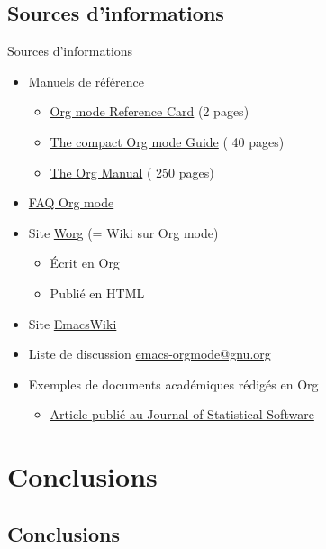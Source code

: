 \documentclass[presentation,t,hideothersubsections]{beamer}
\begin{document}
\subsection{Sources d'informations}
\label{sec-6-2}

\begin{frame}[label=sec-6-2-1]{Sources d'informations}
\begin{itemize}
\item Manuels de référence
\begin{itemize}
\item \href{http://orgmode.org/orgcard.pdf}{Org mode Reference Card} (2 pages)
\item \href{http://orgmode.org/orgguide.pdf}{The compact Org mode Guide} (\textpm{} 40 pages)
\item \href{http://orgmode.org/org.pdf}{The Org Manual} (\textpm{} 250 pages)
\end{itemize}

\item \href{http://orgmode.org/worg/org-faq.html}{FAQ Org mode}

\item Site \href{http://orgmode.org/worg/}{Worg} (= Wiki sur Org mode)
\begin{itemize}
\item Écrit en Org
\item Publié en HTML
\end{itemize}

\item Site \href{http://www.emacswiki.org/emacs/OrgMode}{EmacsWiki}

\item Liste de discussion \href{mailto:emacs-orgmode@gnu.org}{emacs-orgmode@gnu.org}

\item Exemples de documents académiques rédigés en Org
\begin{itemize}
\item \href{http://www.jstatsoft.org/v46/i03}{Article publié au Journal of Statistical Software}
\end{itemize}
\end{itemize}
\end{frame}
\section{Conclusions}
\label{sec-7}

\subsection{Conclusions}
\label{sec-7-1}
\end{document}
